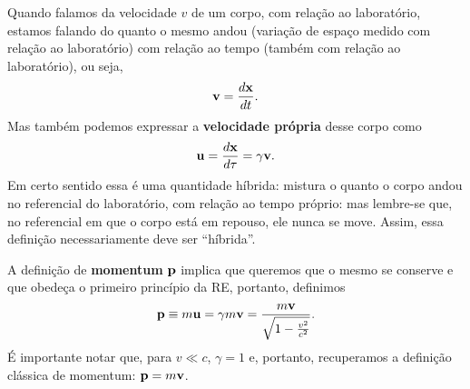 \documentclass[12pt,a4paper,titlepage,brazil]{article}
\begin{document}
Quando falamos da velocidade $v$ de um corpo, com relação ao laboratório, estamos falando do quanto o mesmo andou (variação de espaço medido com relação ao laboratório) com relação ao tempo (também com relação ao laboratório), ou seja,
\begin{equation}
 {\bf v} = \frac{d {\bf x}}{d t} .
\end{equation}  
Mas também podemos expressar a {\bf velocidade própria} desse corpo como
\begin{equation}
 {\bf u} = \frac{d {\bf x}}{d \tau} = \gamma {\bf v} .
\end{equation}  
Em certo sentido essa é uma quantidade híbrida: mistura o quanto o corpo andou no referencial do laboratório, com relação ao tempo próprio: mas lembre-se que, no referencial em que o corpo está em repouso, ele nunca se move. Assim, essa definição necessariamente deve ser ``híbrida''.

A definição de {\bf momentum} ${\bf p}$ implica que queremos que o mesmo se conserve e que obedeça o primeiro princípio da RE, portanto, definimos
\begin{equation}
 {\bf p} \equiv m {\bf u} = \gamma m {\bf v} = \frac{m {\bf v}}{\sqrt{1 - \frac{v^2}{c^2}}}.
\end{equation}
É importante notar que, para $v \ll c$, $\gamma = 1$ e, portanto, recuperamos a definição clássica de momentum: ${\bf p} = m {\bf v}$.
\end{document}
